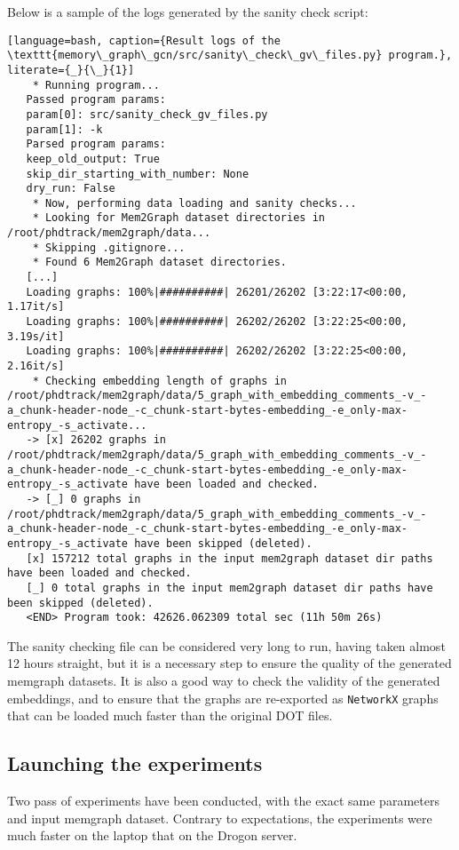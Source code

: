 Below is a sample of the logs generated by the sanity check script:

\begin{lstlisting}[language=bash, caption={Result logs of the \texttt{memory\_graph\_gcn/src/sanity\_check\_gv\_files.py} program.}, literate={_}{\_}{1}]
    * Running program...
   Passed program params:
   param[0]: src/sanity_check_gv_files.py
   param[1]: -k
   Parsed program params:
   keep_old_output: True
   skip_dir_starting_with_number: None
   dry_run: False
    * Now, performing data loading and sanity checks...
    * Looking for Mem2Graph dataset directories in /root/phdtrack/mem2graph/data...
    * Skipping .gitignore...
    * Found 6 Mem2Graph dataset directories.
   [...]
   Loading graphs: 100%|##########| 26201/26202 [3:22:17<00:00,  1.17it/s]
   Loading graphs: 100%|##########| 26202/26202 [3:22:25<00:00,  3.19s/it]
   Loading graphs: 100%|##########| 26202/26202 [3:22:25<00:00,  2.16it/s]
    * Checking embedding length of graphs in /root/phdtrack/mem2graph/data/5_graph_with_embedding_comments_-v_-a_chunk-header-node_-c_chunk-start-bytes-embedding_-e_only-max-entropy_-s_activate...
   -> [x] 26202 graphs in /root/phdtrack/mem2graph/data/5_graph_with_embedding_comments_-v_-a_chunk-header-node_-c_chunk-start-bytes-embedding_-e_only-max-entropy_-s_activate have been loaded and checked.
   -> [_] 0 graphs in /root/phdtrack/mem2graph/data/5_graph_with_embedding_comments_-v_-a_chunk-header-node_-c_chunk-start-bytes-embedding_-e_only-max-entropy_-s_activate have been skipped (deleted).
   [x] 157212 total graphs in the input mem2graph dataset dir paths have been loaded and checked.
   [_] 0 total graphs in the input mem2graph dataset dir paths have been skipped (deleted).
   <END> Program took: 42626.062309 total sec (11h 50m 26s)
\end{lstlisting}

The sanity checking file can be considered very long to run, having taken almost 12 hours straight, but it is a necessary step to ensure the quality of the generated memgraph datasets. It is also a good way to check the validity of the generated embeddings, and to ensure that the graphs are re-exported as \texttt{NetworkX} graphs that can be loaded much faster than the original DOT files.

\subsection{Launching the experiments}
Two pass of experiments have been conducted, with the exact same parameters and input memgraph dataset. Contrary to expectations, the experiments were much faster on the laptop that on the Drogon server. 

